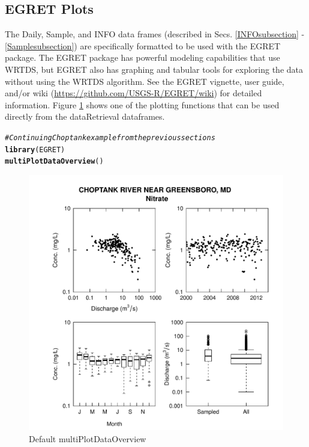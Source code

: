 \documentclass[a4paper,11pt]{article}\usepackage[]{graphicx}\usepackage[]{color}
\makeatletter
\def\maxwidth{ %
  \ifdim\Gin@nat@width>\linewidth
    \linewidth
  \else
    \Gin@nat@width
  \fi
}
\newcommand{\hlcom}[1]{\textcolor[rgb]{0.678,0.584,0.686}{\textit{#1}}}%
\newcommand{\hlstd}[1]{\textcolor[rgb]{0.345,0.345,0.345}{#1}}%
\newcommand{\hlkwd}[1]{\textcolor[rgb]{0.737,0.353,0.396}{\textbf{#1}}}%
\newenvironment{kframe}{%
 \def\at@end@of@kframe{}%
 \ifinner\ifhmode%
  \def\at@end@of@kframe{\end{minipage}}%
  \begin{minipage}{\columnwidth}%
 \fi\fi%
 \def\FrameCommand##1{\hskip\@totalleftmargin \hskip-\fboxsep
 \colorbox{shadecolor}{##1}\hskip-\fboxsep
     \hskip-\linewidth \hskip-\@totalleftmargin \hskip\columnwidth}%
 \MakeFramed {\advance\hsize-\width
   \@totalleftmargin\z@ \linewidth\hsize
   \@setminipage}}%
 {\par\unskip\endMakeFramed%
 \at@end@of@kframe}
\newenvironment{knitrout}{}{} %
\makeatother
\begin{document}
\FloatBarrier

\subsection{EGRET Plots}
The Daily, Sample, and INFO data frames (described in Secs. \ref{INFOsubsection} - \ref{Samplesubsection}) are specifically formatted to be used with the EGRET package. The EGRET package has powerful modeling capabilities that use WRTDS, but EGRET also has graphing and tabular tools for exploring the data without using the WRTDS algorithm. See the EGRET vignette, user guide, and/or wiki (\url{https://github.com/USGS-R/EGRET/wiki}) for detailed information. Figure \ref{fig:egretEx} shows one of the plotting functions that can be used directly from the dataRetrieval dataframes.

\begin{knitrout}
\color{fgcolor}\begin{kframe}
\begin{alltt}
\hlcom{# Continuing Choptank example from the previous sections}
\hlkwd{library}\hlstd{(EGRET)}
\hlkwd{multiPlotDataOverview}\hlstd{()}
\end{alltt}
\end{kframe}\begin{figure}[]

\includegraphics[width=\maxwidth]{figure/egretEx} \caption[Default multiPlotDataOverview]{Default multiPlotDataOverview\label{fig:egretEx}}
\end{figure}


\end{knitrout}
\end{document}
